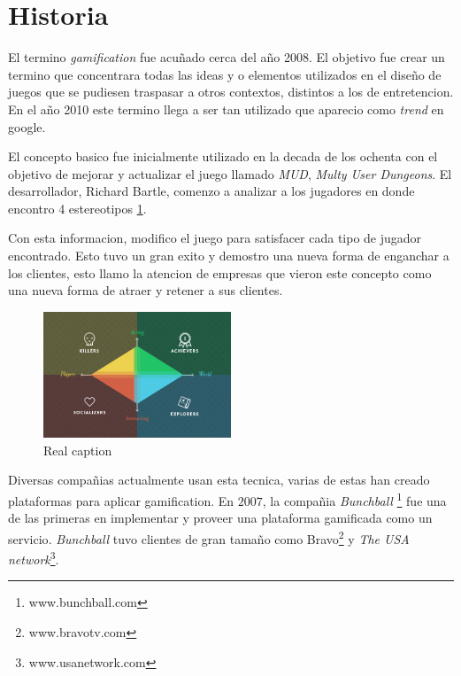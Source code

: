 \section{Historia}

El termino \emph{gamification} fue acuñado cerca del año 2008\cite{DefineGamefication}. 
El objetivo fue crear un termino que concentrara todas las ideas y o elementos utilizados en el 
diseño de juegos que se pudiesen traspasar a otros contextos, distintos a los de entretencion. 
En el año 2010 este termino llega a ser tan utilizado que aparecio como \emph{trend} en google\cite{LiCap1.3}.

El concepto basico fue inicialmente utilizado en la decada de los ochenta con el objetivo 
de mejorar y actualizar el juego llamado \emph{MUD}, \emph{Multy User Dungeons}. El desarrollador, 
Richard Bartle, comenzo a analizar a los jugadores en donde encontro 4 estereotipos \ref{fig:Players}.

Con esta informacion, modifico el juego para satisfacer cada tipo de jugador encontrado. Esto tuvo un 
gran exito y demostro una nueva forma de enganchar a los clientes, esto llamo la atencion de  
empresas que vieron este concepto como una nueva forma de atraer y retener a sus clientes.

\begin{figure}[!htb]
  \centering
  \includegraphics[width=0.5\textwidth]{images/TypeOfPlayersBartle.png}
  \caption[Caption for LOF]{Real caption\footnotemark}
  \label{fig:Players}
\end{figure}



Diversas compañias actualmente usan esta tecnica, varias de estas han creado plataformas para aplicar gamification.
En $2007$, la compañia \emph{Bunchball} \footnote{www.bunchball.com} fue una de las primeras en implementar y proveer
una plataforma gamificada como un servicio\cite{Gam:Bunchball:1}. \emph{Bunchball} tuvo clientes de gran tamaño como
Bravo\footnote{www.bravotv.com} y \emph{The USA network}\footnote{www.usanetwork.com}\cite{Gam:Bunchball:2}.

